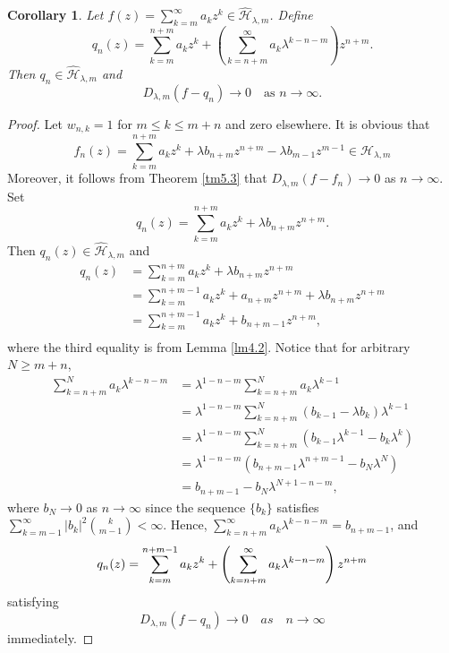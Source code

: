 \documentclass[12pt,reqno]{amsart}
\newtheorem{corollary}[theorem]{Corollary}
\begin{document}
\begin{corollary}\label{co5.4}
Let \( f(z)=\sum_{k=m}^{\infty} a_k z^k \in \widehat{\mathcal{H}}_{\lambda,m} \).
Define
\[
q_n(z)
=\sum_{k=m}^{n+m} a_k z^k
+\left(\sum_{k=n+m}^{\infty} a_k \lambda^{k-n-m}\right) z^{n+m}.
\]
Then \( q_n \in \widehat{\mathcal{H}}_{\lambda,m} \) and
\[
D_{\lambda,m}(f-q_n)\to 0
\quad\text{as } n\to\infty.
\]
\end{corollary}
\begin{proof}
Let ${w_{n,k}} = 1$ for $m \le k \le m + n$ and zero elsewhere. It is obvious that
\[{f_n}(z) = \sum\limits_{k = m}^{n + m} {{a_k}{z^k}}  + \lambda {b_{n + m}}{z^{n + m}} - \lambda {b_{m - 1}}{z^{m - 1}} \in \mathcal{H}_{\lambda, m}\]
Moreover, it follows from Theorem \ref{tm5.3} that ${D_{\lambda ,m}}(f - {f_n}) \to 0$ as $n \to \infty$. Set \[{q_n}(z) = \sum\limits_{k = m}^{n + m} {{a_k}{z^k}}  + \lambda {b_{n + m}}{z^{n + m}}.\]
Then ${q_n}(z) \in \widehat{\mathcal{H}}_{\lambda, m}$ and
\begin{align*}
q_n(z) &= \sum\limits_{k = m}^{n + m} a_k z^k  + \lambda b_{n + m} z^{n + m} \\
&= \sum\limits_{k = m}^{n + m - 1} a_k z^k + a_{n + m} z^{n + m} + \lambda b_{n + m} z^{n + m} \\
&= \sum\limits_{k = m}^{n + m - 1} a_k z^k  + b_{n + m - 1} z^{n + m}, \\
\end{align*}
where the third equality is from Lemma \ref{lm4.2}. Notice that for arbitrary $N \ge m + n$,
\begin{align*}
\sum_{k = n + m}^{N} a_k \lambda^{k - n - m} &= {\lambda ^{1 - n - m}}\sum\limits_{k = n + m}^N {{a_k}{\lambda ^{k - 1}}} \\
&={\lambda ^{1 - n - m}}\sum\limits_{k = n + m}^N {({b_{k - 1}} - \lambda {b_k}){\lambda ^{k - 1}}} \\
&={\lambda ^{1 - n - m}}\sum\limits_{k = n + m}^N {\left( {{b_{k - 1}}{\lambda ^{k - 1}} - {b_k}{\lambda ^k}} \right)} \\
&={\lambda ^{1 - n - m}}({b_{n + m - 1}}{\lambda ^{n + m - 1}} - {b_N}{\lambda ^N})\\
&={b_{n + m - 1}} - {b_N}{\lambda ^{N + 1 - n - m}},
\end{align*}
where ${b_N} \to 0$ as $n \to \infty$ since the sequence $\{ {b_k}\} $ satisfies $\displaystyle \sum_{k = m - 1}^{\infty} |b_k|^2 \binom{k}{m - 1} < \infty$.
Hence, $\sum\limits_{k = n + m}^\infty  {{a_k}{\lambda ^{k - n - m}}}  = {b_{n + m - 1}}$, and
\[{q_n}(z) = \sum\limits_{k = m}^{n + m - 1} {{a_k}} {z^k} + \left( {\sum\limits_{k = n + m}^\infty  {{a_k}} {\lambda ^{k - n - m}}} \right){z^{n + m}}{\rm{ }}\] satisfying
\[{D_{\lambda ,m}}(f - {q_n}) \to 0 \quad as \quad n \to \infty\] immediately.
\end{proof}
\end{document}

